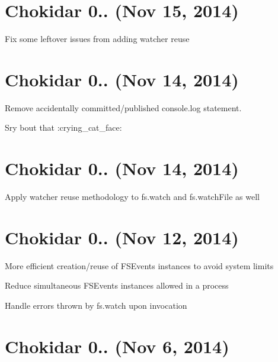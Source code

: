 \section*{Chokidar 0.. (Nov 15, 2014)}


\begin{DoxyItemize}
\item Fix some leftover issues from adding watcher reuse
\end{DoxyItemize}

\section*{Chokidar 0.. (Nov 14, 2014)}


\begin{DoxyItemize}
\item Remove accidentally committed/published {\ttfamily console.\+log} statement.
\item Sry \textquotesingle{}bout that \+:crying\+\_\+cat\+\_\+face\+:
\end{DoxyItemize}

\section*{Chokidar 0.. (Nov 14, 2014)}


\begin{DoxyItemize}
\item Apply watcher reuse methodology to {\ttfamily fs.\+watch} and {\ttfamily fs.\+watch\+File} as well
\end{DoxyItemize}

\section*{Chokidar 0.. (Nov 12, 2014)}


\begin{DoxyItemize}
\item More efficient creation/reuse of F\+S\+Events instances to avoid system limits
\item Reduce simultaneous F\+S\+Events instances allowed in a process
\item Handle errors thrown by {\ttfamily fs.\+watch} upon invocation
\end{DoxyItemize}

\section*{Chokidar 0.. (Nov 6, 2014)}


